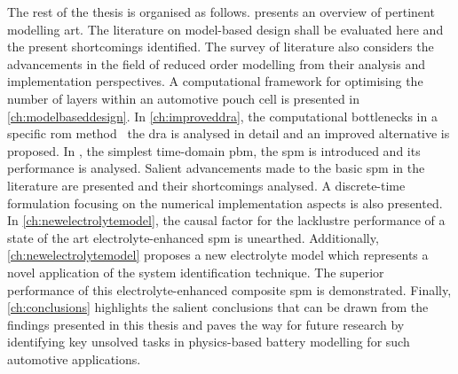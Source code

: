 The rest of the thesis is organised as follows.  presents an
overview of pertinent modelling art.  The literature on model-based design shall
be  evaluated  here and  the  present  shortcomings  identified. The  survey  of
literature  also  considers the  advancements  in  the  field of  reduced  order
modelling from  their analysis and implementation  perspectives. A computational
framework  for  optimising the  number  of  layers  within an  automotive  pouch
cell  is  presented  in  \cref{ch:modelbaseddesign}.  In  \cref{ch:improveddra},
the  computational   bottlenecks  in   a  specific  \gls{rom}   method  \viz~the
\gls{dra} is  analysed in  detail and  an improved  alternative is  proposed. In
,  the simplest  time-domain  \gls{pbm},  the \gls{spm}  is
introduced  and  its  performance  is analysed.  Salient  advancements  made  to
the  basic \gls{spm}  in the  literature  are presented  and their  shortcomings
analysed. A  discrete-time formulation focusing on  the numerical implementation
aspects is  also presented. In \cref{ch:newelectrolytemodel},  the causal factor
for  the lacklustre  performance  of  a state  of  the art  electrolyte-enhanced
\gls{spm} is  unearthed. Additionally, \cref{ch:newelectrolytemodel}  proposes a
new  electrolyte  model which  represents  a  novel  application of  the  system
identification technique. The superior  performance of this electrolyte-enhanced
composite \gls{spm}  is demonstrated. Finally,  \cref{ch:conclusions} highlights
the salient  conclusions that can be  drawn from the findings  presented in this
thesis and paves  the way for future research by  identifying key unsolved tasks
in physics-based battery modelling for such automotive applications.






